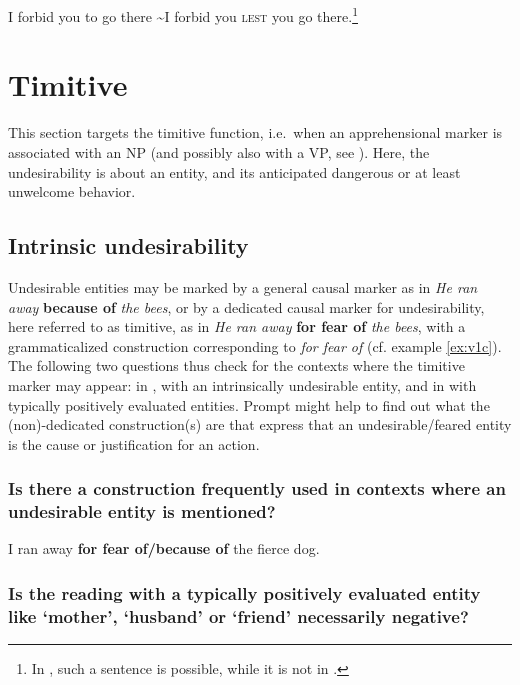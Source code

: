 \documentclass[output=paper,colorlinks,citecolor=brown]{langscibook}
\begin{document}
\ea \label{p63odd} I forbid you to go there {\op}\sim I forbid you \textsc{lest} you go there{\cp}.\textnormal{\footnote{In  \citep[304--305]{francois2003}, such a sentence is possible, while it is not in .}}
\z




\section{Timitive}
\label{sec:timitive}

This section targets the timitive function, i.e.\ when an apprehensional marker is associated with an NP (and possibly also with a VP, see ). Here, the undesirability is about an entity, and its anticipated dangerous or at least unwelcome behavior. 



\subsection{Intrinsic undesirability}
\label{subsec:timintrinsic}

Undesirable entities may be marked by a general causal marker as in \textit{He ran away} \textbf{because of} \textit{the bees}, or by a dedicated causal marker for undesirability, here referred to as timitive, as in \textit{He ran away} \textbf{for fear of} \textit{the bees}, with a grammaticalized construction corresponding to  \textit{for fear of} (cf. example \ref{ex:v1c}). The following two questions thus check for the contexts where the timitive marker may appear: in , with an intrinsically undesirable entity, and in  with typically positively evaluated entities. Prompt  might help to find out what the (non)-dedicated construction(s) are that express that an undesirable/feared entity is the cause or justification for an action.

\subsubsection{Is there a construction frequently used in contexts where an undesirable entity is mentioned?}
\label{3.1.1}

\ea \label{p61} I ran away \textbf{for fear of/because of} the fierce dog.
\z

\subsubsection{Is the reading with a typically positively evaluated entity like `mother', `husband' or `friend' necessarily negative?}
\label{3.1.2}
\end{document}
